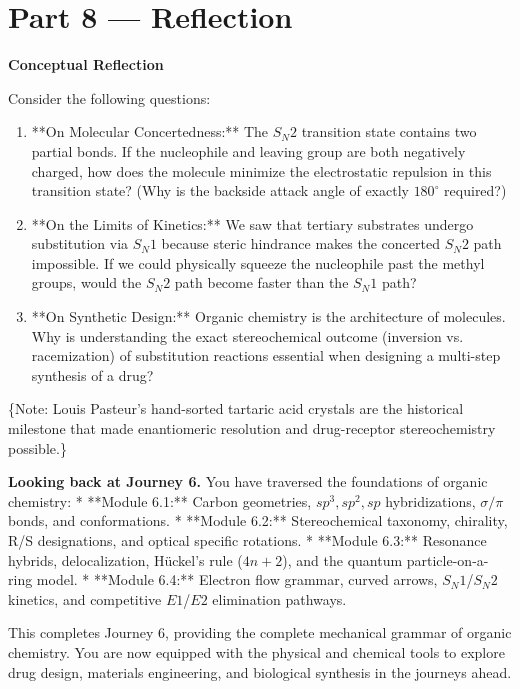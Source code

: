 \documentclass[12pt, a4paper]{book}
\begin{document}
\newpage

\section{Part 8 --- Reflection}

\begin{reflectionbox}
\textbf{Conceptual Reflection}

Consider the following questions:
\begin{enumerate}
  \item **On Molecular Concertedness:** The $S_N2$ transition state contains two partial bonds. If the nucleophile and leaving group are both negatively charged, how does the molecule minimize the electrostatic repulsion in this transition state? (Why is the backside attack angle of exactly $180^\circ$ required?)
  \item **On the Limits of Kinetics:** We saw that tertiary substrates undergo substitution via $S_N1$ because steric hindrance makes the concerted $S_N2$ path impossible. If we could physically squeeze the nucleophile past the methyl groups, would the $S_N2$ path become faster than the $S_N1$ path?
  \item **On Synthetic Design:** Organic chemistry is the architecture of molecules. Why is understanding the exact stereochemical outcome (inversion vs. racemization) of substitution reactions essential when designing a multi-step synthesis of a drug?
\end{enumerate}
\{Note: Louis Pasteur's hand-sorted tartaric acid crystals are the historical milestone that made enantiomeric resolution and drug-receptor stereochemistry possible.\}
\end{reflectionbox}

\medskip
\noindent\textbf{Looking back at Journey 6.}
You have traversed the foundations of organic chemistry:
* **Module 6.1:** Carbon geometries, $sp^3, sp^2, sp$ hybridizations, $\sigma/\pi$ bonds, and conformations.
* **Module 6.2:** Stereochemical taxonomy, chirality, R/S designations, and optical specific rotations.
* **Module 6.3:** Resonance hybrids, delocalization, Hückel's rule ($4n+2$), and the quantum particle-on-a-ring model.
* **Module 6.4:** Electron flow grammar, curved arrows, $S_N1$/$S_N2$ kinetics, and competitive $E1$/$E2$ elimination pathways.

This completes Journey 6, providing the complete mechanical grammar of organic chemistry. You are now equipped with the physical and chemical tools to explore drug design, materials engineering, and biological synthesis in the journeys ahead.
\end{document}
